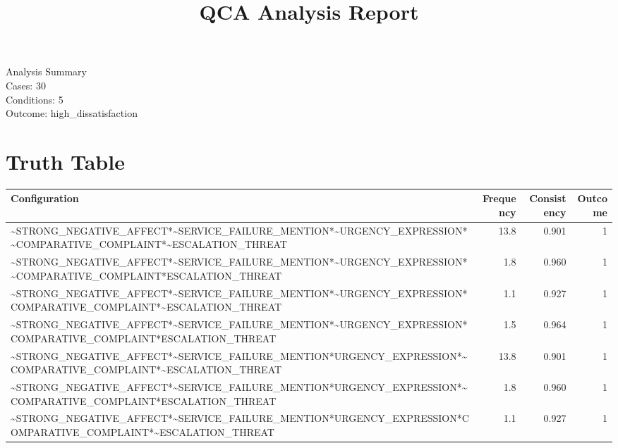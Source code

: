 \documentclass[12pt,a4paper]{article}
\title{QCA Analysis Report}
\begin{document}
\maketitle
\begin{center}
\large
Analysis Summary \\
Cases: 30 \\
Conditions: 5 \\
Outcome: high\_dissatisfaction
\end{center}
\newpage

\tableofcontents

\newpage


\section{Truth Table}
\begin{longtable}{lrrr}
\toprule
Configuration & Frequency & Consistency & Outcome \\
\midrule
    \textasciitilde{}STRONG\_NEGATIVE\_AFFECT*\textasciitilde{}SERVICE\_FAILURE\_MENTION*\textasciitilde{}URGENCY\_EXPRESSION*\textasciitilde{}COMPARATIVE\_COMPLAINT*\textasciitilde{}ESCALATION\_THREAT & 13.8 & 0.901 & 1 \\
    \textasciitilde{}STRONG\_NEGATIVE\_AFFECT*\textasciitilde{}SERVICE\_FAILURE\_MENTION*\textasciitilde{}URGENCY\_EXPRESSION*\textasciitilde{}COMPARATIVE\_COMPLAINT*ESCALATION\_THREAT & 1.8 & 0.960 & 1 \\
    \textasciitilde{}STRONG\_NEGATIVE\_AFFECT*\textasciitilde{}SERVICE\_FAILURE\_MENTION*\textasciitilde{}URGENCY\_EXPRESSION*COMPARATIVE\_COMPLAINT*\textasciitilde{}ESCALATION\_THREAT & 1.1 & 0.927 & 1 \\
    \textasciitilde{}STRONG\_NEGATIVE\_AFFECT*\textasciitilde{}SERVICE\_FAILURE\_MENTION*\textasciitilde{}URGENCY\_EXPRESSION*COMPARATIVE\_COMPLAINT*ESCALATION\_THREAT & 1.5 & 0.964 & 1 \\
    \textasciitilde{}STRONG\_NEGATIVE\_AFFECT*\textasciitilde{}SERVICE\_FAILURE\_MENTION*URGENCY\_EXPRESSION*\textasciitilde{}COMPARATIVE\_COMPLAINT*\textasciitilde{}ESCALATION\_THREAT & 13.8 & 0.901 & 1 \\
    \textasciitilde{}STRONG\_NEGATIVE\_AFFECT*\textasciitilde{}SERVICE\_FAILURE\_MENTION*URGENCY\_EXPRESSION*\textasciitilde{}COMPARATIVE\_COMPLAINT*ESCALATION\_THREAT & 1.8 & 0.960 & 1 \\
    \textasciitilde{}STRONG\_NEGATIVE\_AFFECT*\textasciitilde{}SERVICE\_FAILURE\_MENTION*URGENCY\_EXPRESSION*COMPARATIVE\_COMPLAINT*\textasciitilde{}ESCALATION\_THREAT & 1.1 & 0.927 & 1 \\

\end{longtable}
\end{document}
